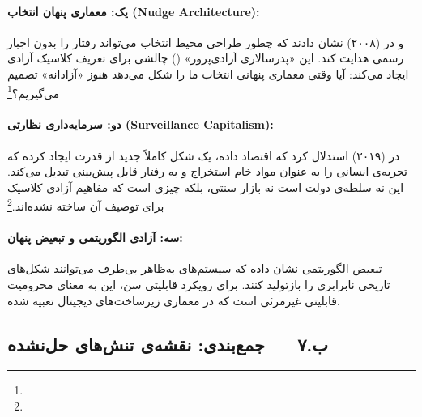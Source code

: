 \paragraph{یک: معماری پنهان انتخاب (Nudge Architecture):}
 و  در  (۲۰۰۸) نشان دادند که چطور طراحی محیط انتخاب می‌تواند رفتار را بدون اجبار رسمی هدایت کند. این «پدرسالاری آزادی‌پرور» () چالشی برای تعریف کلاسیک آزادی ایجاد می‌کند: آیا وقتی معماری پنهانی انتخاب ما را شکل می‌دهد هنوز «آزادانه» تصمیم می‌گیریم؟\footnote{} %

\paragraph{دو: سرمایه‌داری نظارتی (Surveillance Capitalism):}
 در  (۲۰۱۹) استدلال کرد که اقتصاد داده، یک شکل کاملاً جدید از قدرت ایجاد کرده که تجربه‌ی انسانی را به عنوان مواد خام استخراج و به رفتار قابل پیش‌بینی تبدیل می‌کند. این نه سلطه‌ی دولت است نه بازار سنتی، بلکه چیزی است که مفاهیم آزادی کلاسیک برای توصیف آن ساخته نشده‌اند.\footnote{} %

\paragraph{سه: آزادی الگوریتمی و تبعیض پنهان:}
تبعیض الگوریتمی نشان داده که سیستم‌های به‌ظاهر بی‌طرف می‌توانند شکل‌های تاریخی نابرابری را بازتولید کنند. برای رویکرد قابلیتی سن، این به معنای محرومیت قابلیتی غیرمرئی است که در معماری زیرساخت‌های دیجیتال تعبیه شده.

\subsection{ب.۷ — جمع‌بندی: نقشه‌ی تنش‌های حل‌نشده}
\label{subsec:summary_tensions}

